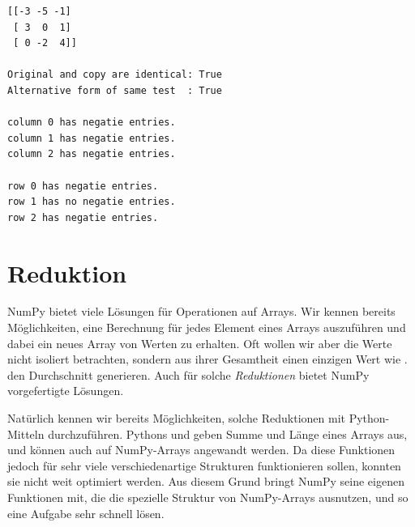 \begin{cmdbox}
\begin{verbatim}
[[-3 -5 -1]
 [ 3  0  1]
 [ 0 -2  4]]

Original and copy are identical: True
Alternative form of same test  : True

column 0 has negatie entries.
column 1 has negatie entries.
column 2 has negatie entries.

row 0 has negatie entries.
row 1 has no negatie entries.
row 2 has negatie entries.
\end{verbatim}
\end{cmdbox}

\section{Reduktion}
NumPy bietet viele Lösungen für Operationen auf Arrays. Wir kennen bereits Möglichkeiten, eine Berechnung für jedes Element eines Arrays auszuführen und dabei ein neues Array von Werten zu erhalten. Oft wollen wir aber die Werte nicht isoliert betrachten, sondern aus ihrer Gesamtheit einen einzigen Wert wie \eg. den Durchschnitt generieren. Auch für solche \emph{Reduktionen} bietet NumPy vorgefertigte Lösungen.

Natürlich kennen wir bereits Möglichkeiten, solche Reduktionen mit Python-Mitteln durchzuführen. Pythons  und  geben Summe und Länge eines Arrays aus, und können auch auf NumPy-Arrays angewandt werden. Da diese Funktionen jedoch für sehr viele verschiedenartige Strukturen funktionieren sollen, konnten sie nicht weit optimiert werden. Aus diesem Grund bringt NumPy seine eigenen Funktionen mit, die die spezielle Struktur von NumPy-Arrays ausnutzen, und so eine Aufgabe sehr schnell lösen.

